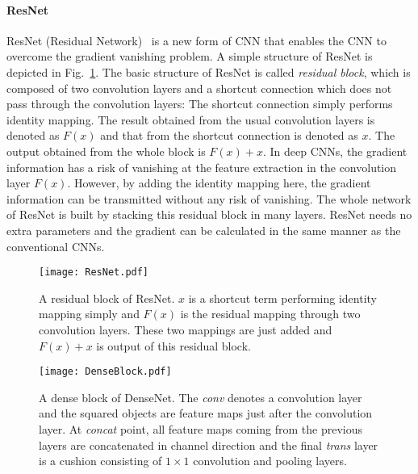 \documentclass[journal]{IEEEtran}
\begin{document}
\paragraph*{\textbf{ResNet}}
ResNet (Residual Network)~\cite{He2017} is a new form of CNN that enables the CNN to overcome the gradient vanishing problem.
A simple structure of ResNet is depicted in Fig.~\ref{fig:ResNet}.
The basic structure of ResNet is called \emph{residual block}, which is composed of two convolution layers and a shortcut connection which does not pass through the convolution layers: The shortcut connection simply performs identity mapping.
The result obtained from the usual convolution layers is denoted as $F(x)$ and that from the shortcut connection is denoted as $x$.
The output obtained from the whole block is $F(x)+x$.
In deep CNNs, the gradient information has a risk of vanishing at the feature extraction in the convolution layer $F(x)$.
However, by adding the identity mapping here, the gradient information can be transmitted without any risk of vanishing.
The whole network of ResNet is built by stacking this residual block in many layers.
ResNet needs no extra parameters and the gradient can be calculated in the same manner as the conventional CNNs.

\begin{figure}[!t]
\centering
\texttt{[image: ResNet.pdf]}
\caption{A residual block of ResNet.
$x$ is a shortcut term performing identity mapping simply and $F(x)$ is the residual mapping through two convolution layers.
These two mappings are just added and $F(x)+x$ is output of this residual block.}
\label{fig:ResNet}
\end{figure}

\begin{figure}[!t]
\centering
\texttt{[image: DenseBlock.pdf]}
\vspace*{-1cm}
\caption{A dense block of DenseNet.
The \emph{conv} denotes a convolution layer and the squared objects are feature maps just after the convolution layer.
At \emph{concat} point, all feature maps coming from the previous layers are concatenated in channel direction and the final \emph{trans} layer is a cushion consisting of $1\times1$ convolution and pooling layers.
}
\label{fig:DenseBlock}
\end{figure}
\end{document}
